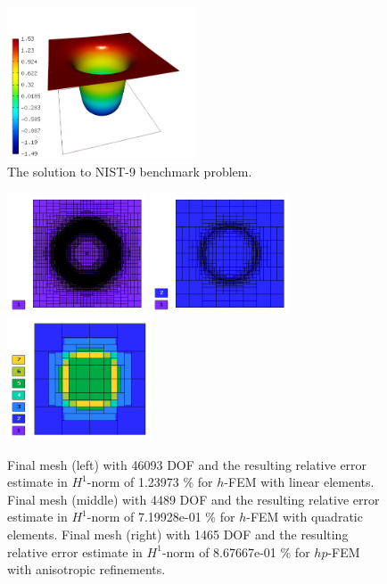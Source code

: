 \documentclass[12pt]{elsarticle}
\begin{document}
\begin{figure}[H]
\centering
\vspace{-5mm}
\includegraphics[height=4.5cm]{nist/nist-9/solution.png}
\vspace{-5mm}
\caption{The solution to NIST-9 benchmark problem.}
\vspace{-5mm}
\label{fig:sln-nist09}
\end{figure}

\begin{figure}[H]
\centering
\vspace{-5mm}
\includegraphics[height=3.6cm]{nist/nist-9/mesh_h1_aniso.png}
\includegraphics[height=3.6cm]{nist/nist-9/mesh_h2_aniso.png}
\includegraphics[height=3.6cm]{nist/nist-9/mesh_hp_aniso.png}
\vspace{-5mm}
\caption{
Final mesh (left) with 46093 DOF and the resulting
relative error estimate in $H^1$-norm of 1.23973 \% for $h$-FEM with linear elements.
Final mesh (middle) with 4489 DOF and the resulting
relative error estimate in $H^1$-norm of 7.19928e-01 \% for $h$-FEM with quadratic elements.
Final mesh (right) with 1465 DOF and the resulting
relative error estimate in $H^1$-norm of 8.67667e-01 \% for $hp$-FEM with anisotropic refinements.}
\vspace{-5mm}
\label{fig:nist-9-hp-aniso}
\end{figure}
\end{document}
